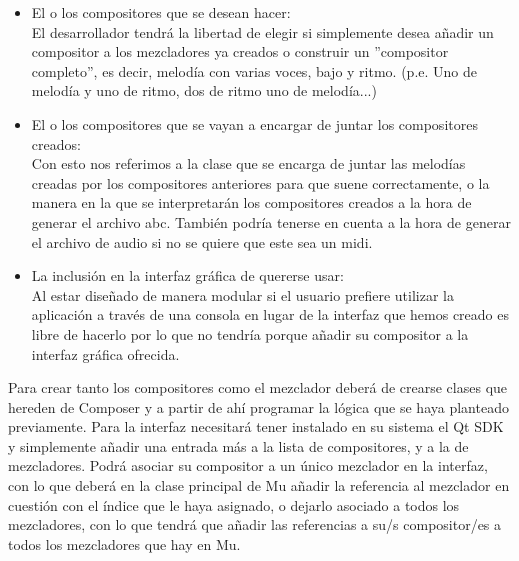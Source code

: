\begin{itemize}

\item El o los compositores que se desean hacer:
\\El desarrollador tendrá la libertad de elegir si simplemente desea añadir un compositor a los mezcladores ya creados o construir un ''compositor completo'', es decir, melodía con varias voces, bajo y ritmo. (p.e. Uno de melodía y uno de ritmo, dos de ritmo uno de melodía...)

\item El o los compositores que se vayan a encargar de juntar los compositores creados:
\\Con esto nos referimos a la clase que se encarga de juntar las melodías creadas por los compositores anteriores para que suene correctamente, o la manera en la que se interpretarán los compositores creados a la hora de generar el archivo abc. También podría tenerse en cuenta a la hora de generar el archivo de audio si no se quiere que este sea un midi.

\item La inclusión en la interfaz gráfica de quererse usar:
\\Al estar diseñado de manera modular si el usuario prefiere utilizar la aplicación a través de una consola en lugar 	de la interfaz que hemos creado es libre de hacerlo por lo que no tendría porque añadir su compositor a la interfaz gráfica ofrecida.

\end{itemize} 

Para crear tanto los compositores como el mezclador deberá de crearse clases que hereden de Composer y a partir de ahí programar la lógica que se haya planteado previamente.
Para la interfaz necesitará tener instalado en su sistema el Qt SDK y simplemente añadir una entrada más a la lista de compositores, y a la de mezcladores. Podrá asociar su compositor a un único mezclador en la interfaz, con lo que deberá en la clase principal de Mu añadir la referencia al mezclador en cuestión con el índice que le haya asignado, o dejarlo asociado a todos los mezcladores, con lo que tendrá que añadir las referencias a su/s compositor/es a todos los mezcladores que hay en Mu.